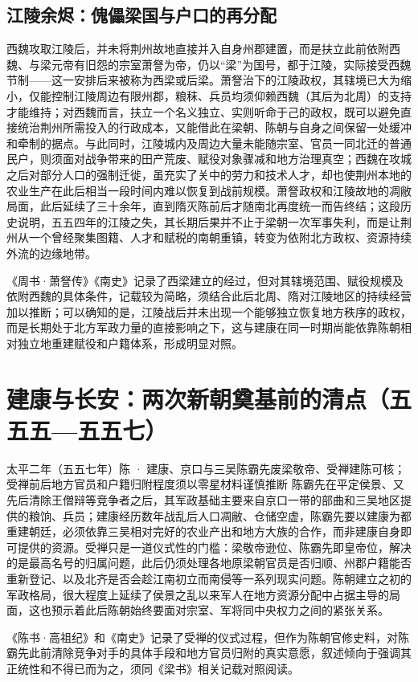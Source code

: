 \subsection{江陵余烬：傀儡梁国与户口的再分配}

西魏攻取江陵后，并未将荆州故地直接并入自身州郡建置，而是扶立此前依附西魏、与梁元帝有旧怨的宗室萧詧为帝，仍以“梁”为国号，都于江陵，实际接受西魏节制——这一安排后来被称为西梁或后梁。萧詧治下的江陵政权，其辖境已大为缩小，仅能控制江陵周边有限州郡，粮秣、兵员均须仰赖西魏（其后为北周）的支持才能维持；对西魏而言，扶立一个名义独立、实则听命于己的政权，既可以避免直接统治荆州所需投入的行政成本，又能借此在梁朝、陈朝与自身之间保留一处缓冲和牵制的据点。与此同时，江陵城内及周边大量未能随宗室、官员一同北迁的普通民户，则须面对战争带来的田产荒废、赋役对象骤减和地方治理真空；西魏在攻城之后对部分人口的强制迁徙，虽充实了关中的劳力和技术人才，却也使荆州本地的农业生产在此后相当一段时间内难以恢复到战前规模。萧詧政权和江陵故地的凋敝局面，此后延续了三十余年，直到隋灭陈前后才随南北再度统一而告终结；这段历史说明，五五四年的江陵之失，其长期后果并不止于梁朝一次军事失利，而是让荆州从一个曾经聚集图籍、人才和赋税的南朝重镇，转变为依附北方政权、资源持续外流的边缘地带。

《周书·萧詧传》《南史》记录了西梁建立的经过，但对其辖境范围、赋役规模及依附西魏的具体条件，记载较为简略，须结合此后北周、隋对江陵地区的持续经营加以推断；可以确知的是，江陵战后并未出现一个能够独立恢复地方秩序的政权，而是长期处于北方军政力量的直接影响之下，这与建康在同一时期尚能依靠陈朝相对独立地重建赋役和户籍体系，形成明显对照。

\section{建康与长安：两次新朝奠基前的清点（五五五—五五七）}

\begin{event}{}{太平二年（五五七年）}{陈 · 建康、京口与三吴}{陈霸先废梁敬帝、受禅建陈可核；受禅前后地方官员和户籍归附程度须以零星材料谨慎推断}
陈霸先在平定侯景、又先后清除王僧辩等竞争者之后，其军政基础主要来自京口一带的部曲和三吴地区提供的粮饷、兵员；建康经历数年战乱后人口凋敝、仓储空虚，陈霸先要以建康为都重建朝廷，必须依靠三吴相对完好的农业产出和地方大族的合作，而非建康自身即可提供的资源。受禅只是一道仪式性的门槛：梁敬帝逊位、陈霸先即皇帝位，解决的是最高名号的归属问题，此后仍须处理各地原梁朝官员是否归顺、州郡户籍能否重新登记、以及北齐是否会趁江南初立而南侵等一系列现实问题。陈朝建立之初的军政格局，很大程度上延续了侯景之乱以来军人在地方资源分配中占据主导的局面，这也预示着此后陈朝始终要面对宗室、军将同中央权力之间的紧张关系。

《陈书·高祖纪》和《南史》记录了受禅的仪式过程，但作为陈朝官修史料，对陈霸先此前清除竞争对手的具体手段和地方官员归附的真实意愿，叙述倾向于强调其正统性和不得已而为之，须同《梁书》相关记载对照阅读。
\end{event}

